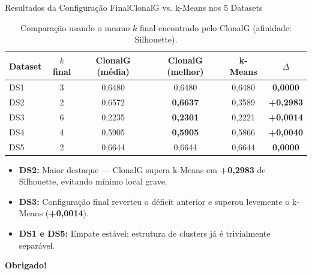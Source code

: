 \documentclass[aspectratio=169, 11pt]{beamer}
\begin{document}
\begin{frame}{Resultados da Configuração Final}{ClonalG vs. k-Means nos 5 Datasets}
  \begin{table}
    \centering
    \scriptsize
    \begin{tabular}{lccccc}
      \toprule
      Dataset & $k$ final & ClonalG (média) & ClonalG (melhor) & k-Means & $\Delta$ \\
      \midrule
      DS1 & 3 & 0,6480 & 0,6480 & 0,6480 & \textbf{0,0000} \\
      DS2 & 2 & 0,6572 & \textbf{0,6637} & 0,3589 & \textbf{+0,2983} \\
      DS3 & 6 & 0,2235 & \textbf{0,2301} & 0,2221 & \textbf{+0,0014} \\
      DS4 & 4 & 0,5905 & \textbf{0,5905} & 0,5866 & \textbf{+0,0040} \\
      DS5 & 2 & 0,6644 & 0,6644 & 0,6644 & \textbf{0,0000} \\
      \bottomrule
    \end{tabular}
    \caption{Comparação usando o mesmo $k$ final encontrado pelo ClonalG (afinidade: Silhouette).}
  \end{table}
  \begin{itemize}
    \item \textbf{DS2:} Maior destaque --- ClonalG supera k-Means em \textbf{+0,2983} de Silhouette, evitando mínimo local grave.
    \item \textbf{DS3:} Configuração final reverteu o déficit anterior e superou levemente o k-Means (\textbf{+0,0014}).
    \item \textbf{DS1 e DS5:} Empate estável; estrutura de clusters já é trivialmente separável.
  \end{itemize}
\end{frame}


\begin{frame}[c]
  \begin{center}
    \Huge \textbf{Obrigado!}
  \end{center}
\end{frame}
\end{document}
